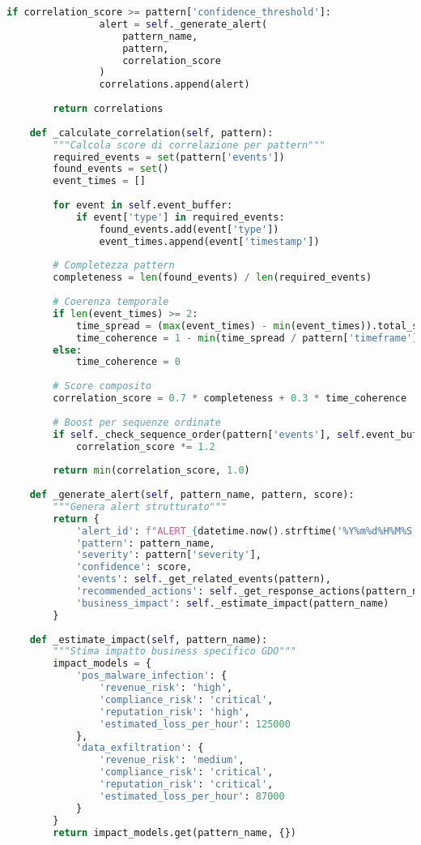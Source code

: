 \begin{lstlisting}[language=Python, caption=Algoritmo di Correlazione Eventi SIEM]
            if correlation_score >= pattern['confidence_threshold']:
                alert = self._generate_alert(
                    pattern_name, 
                    pattern, 
                    correlation_score
                )
                correlations.append(alert)
        
        return correlations
    
    def _calculate_correlation(self, pattern):
        """Calcola score di correlazione per pattern"""
        required_events = set(pattern['events'])
        found_events = set()
        event_times = []
        
        for event in self.event_buffer:
            if event['type'] in required_events:
                found_events.add(event['type'])
                event_times.append(event['timestamp'])
        
        # Completezza pattern
        completeness = len(found_events) / len(required_events)
        
        # Coerenza temporale
        if len(event_times) >= 2:
            time_spread = (max(event_times) - min(event_times)).total_seconds()
            time_coherence = 1 - min(time_spread / pattern['timeframe'], 1)
        else:
            time_coherence = 0
        
        # Score composito
        correlation_score = 0.7 * completeness + 0.3 * time_coherence
        
        # Boost per sequenze ordinate
        if self._check_sequence_order(pattern['events'], self.event_buffer):
            correlation_score *= 1.2
        
        return min(correlation_score, 1.0)
    
    def _generate_alert(self, pattern_name, pattern, score):
        """Genera alert strutturato"""
        return {
            'alert_id': f"ALERT_{datetime.now().strftime('%Y%m%d%H%M%S')}",
            'pattern': pattern_name,
            'severity': pattern['severity'],
            'confidence': score,
            'events': self._get_related_events(pattern),
            'recommended_actions': self._get_response_actions(pattern_name),
            'business_impact': self._estimate_impact(pattern_name)
        }
    
    def _estimate_impact(self, pattern_name):
        """Stima impatto business specifico GDO"""
        impact_models = {
            'pos_malware_infection': {
                'revenue_risk': 'high',
                'compliance_risk': 'critical',
                'reputation_risk': 'high',
                'estimated_loss_per_hour': 125000
            },
            'data_exfiltration': {
                'revenue_risk': 'medium',
                'compliance_risk': 'critical',
                'reputation_risk': 'critical',
                'estimated_loss_per_hour': 87000
            }
        }
        return impact_models.get(pattern_name, {})
\end{lstlisting}

